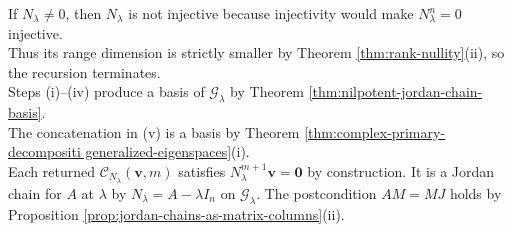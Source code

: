 \begin{computationmethod}
\begin{enumerate}[label=(\roman*)]
\end{enumerate}
If $N_{\lambda}\neq0$, then $N_{\lambda}$ is not injective because injectivity would make $N_{\lambda}^n=0$ injective.\\
Thus its range dimension is strictly smaller by Theorem \ref{thm:rank-nullity}(ii), so the recursion terminates.\\
Steps (i)--(iv) produce a basis of $\mathcal{G}_{\lambda}$ by Theorem \ref{thm:nilpotent-jordan-chain-basis}.\\
The concatenation in (v) is a basis by Theorem \ref{thm:complex-primary-decompositi generalized-eigenspaces}(i).\\
Each returned $\mathcal{C}_{N_{\lambda}}(\mathbf{v},m)$ satisfies $N_{\lambda}^{m+1}\mathbf{v}=\mathbf{0}$ by construction. It is a Jordan chain for $A$ at $\lambda$ by $N_{\lambda}=A-\lambda I_n$ on $\mathcal{G}_{\lambda}$. The postcondition $AM=MJ$ holds by Proposition \ref{prop:jordan-chains-as-matrix-columns}(ii).
\end{computationmethod}

